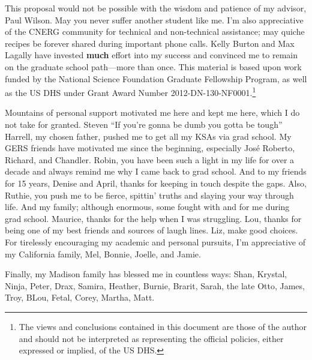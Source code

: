 \footnotesize{ This proposal would not be possible with the wisdom and patience
of my advisor, Paul Wilson. May you never suffer another student like me.  I'm
also appreciative of the CNERG community for technical and non-technical
assistance; may quiche recipes be forever shared during important phone calls.
Kelly Burton and Max Lagally have invested \textbf{much} effort into my success
and convinced me to remain on the graduate school path---more than once.  This
material is based upon work funded by the National Science Foundation Graduate
Fellowship Program, as well as the \gls{US} \gls{DHS} under Grant Award Number
2012-DN-130-NF0001.\footnote{The views and conclusions contained in this
document are those of the author and should not be interpreted as representing
the official policies, either expressed or implied, of the \gls{US} \gls{DHS}.} 

Mountains of personal support motivated me here and kept me here, which I do
not take for granted. Steven ``If you're gonna be dumb you gotta be tough''
Harrell, my chosen father, pushed me to get all my KSAs via grad school.  My
GERS friends have motivated me since the beginning, especially Jos\'e Roberto,
Richard, and Chandler.  Robin, you have been such a light in my life for over a
decade and always remind me why I came back to grad school.  And to my friends
for 15 years, Denise and April, thanks for keeping in touch despite the gaps.
Also, Ruthie, you push me to be fierce, spittin' truths and slaying your way
through life.  And my family; although enormous, some fought with and for me
during grad school.  Maurice, thanks for the help when I was struggling.  Lou,
thanks for being one of my best friends and sources of laugh lines. Liz, make
good choices.  For tirelessly encouraging my academic and personal pursuits,
I'm appreciative of my California family, Mel, Bonnie, Joelle, and Jamie. 

Finally, my Madison family has blessed me in countless ways: Shan, Krystal,
Ninja, Peter, Drax, Samira, Heather, Burnie, Brarit, Sarah, the late Otto,
James, Troy, BLou, Fetal, Corey, Martha, Matt.
}
